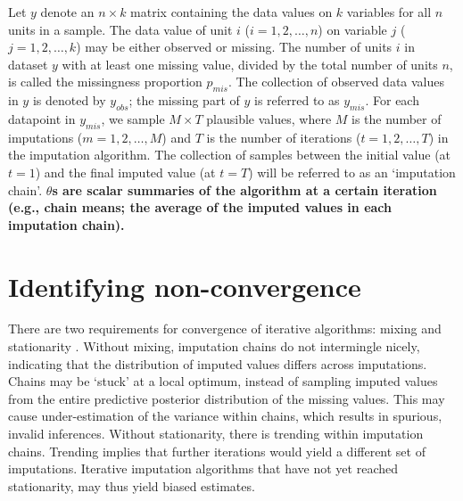 \documentclass[Royal,times,sageh]{sagej}
\begin{document}
Let \(y\) denote an \(n \times k\) matrix containing the data values on \(k\) variables for all \(n\) units in a sample. The data value of unit \(i\) (\(i = 1, 2, \dots, n\)) on variable \(j\) (\(j = 1, 2, \dots, k\)) may be either observed or missing. The number of units \(i\) in dataset \(y\) with at least one missing value, divided by the total number of units \(n\), is called the missingness proportion \(p_{mis}\). The collection of observed data values in \(y\) is denoted by \(y_{obs}\); the missing part of \(y\) is referred to as \(y_{mis}\). For each datapoint in \(y_{mis}\), we sample \(M \times T\) plausible values, where \(M\) is the number of imputations (\(m = 1, 2, \dots, M\)) and \(T\) is the number of iterations (\(t = 1, 2, \dots, T\)) in the imputation algorithm. The collection of samples between the initial value (at \(t=1\)) and the final imputed value (at \(t=T\)) will be referred to as an `imputation chain'. \textbf{\(\theta\)s are scalar summaries of the algorithm at a certain iteration (e.g., chain means; the average of the imputed values in each imputation chain). }

\hypertarget{identifying-non-convergence}{%
\section{Identifying non-convergence}\label{identifying-non-convergence}}

There are two requirements for convergence of iterative algorithms: mixing and stationarity \citep{gelm13}. Without mixing, imputation chains do not intermingle nicely, indicating that the distribution of imputed values differs across imputations. Chains may be `stuck' at a local optimum, instead of sampling imputed values from the entire predictive posterior distribution of the missing values. This may cause under-estimation of the variance within chains, which results in spurious, invalid inferences. Without stationarity, there is trending within imputation chains. Trending implies that further iterations would yield a different set of imputations. Iterative imputation algorithms that have not yet reached stationarity, may thus yield biased estimates.
\end{document}
